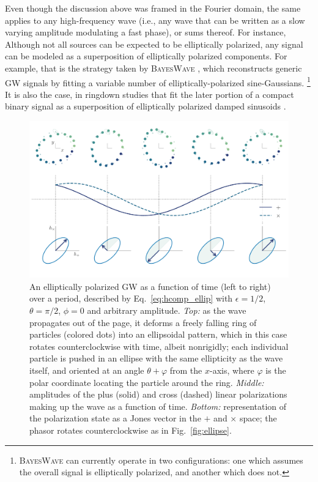 \documentclass[aps,prd,twocolumn,superscriptaddress,preprintnumbers,floatfix,nofootinbib]{revtex4-2}
\begin{document}
Even though the discussion above was framed in the Fourier domain, the same applies to any high-frequency wave (i.e., any wave that can be written as a slow varying amplitude modulating a fast phase), or sums thereof.
For instance, 
Although not all sources can be expected to be elliptically polarized, any signal can be modeled as a superposition of elliptically polarized components.
For example, that is the strategy taken by \textsc{BayesWave} \cite{Cornish:2014kda,Cornish:2020dwh}, which reconstructs generic GW signals by fitting a variable number of elliptically-polarized sine-Gaussians.%
\footnote{\textsc{BayesWave} can currently operate in two configurations: one which assumes the overall signal is elliptically polarized, and another which does not.}
It is also the case, in ringdown studies that fit the later portion of a compact binary signal as a superposition of elliptically polarized damped sinusoids \cite{Isi:2021iql}.

\begin{figure}
\includegraphics[width=\columnwidth]{pol_diagram_ellip}
\caption{An elliptically polarized GW as a function of time (left to right) over a period, described by Eq.~\eqref{eq:hcomp_ellip} with $\epsilon=1/2$, $\theta=\pi/2$, $\phi=0$ and arbitrary amplitude. \emph{Top:} as the wave propagates out of the page, it deforms a freely falling ring of particles (colored dots) into an ellipsoidal pattern, which in this case rotates counterclockwise with time, albeit nonrigidly; each individual particle is pushed in an ellipse with the same ellipticity as the wave itself, and oriented at an angle $\theta + \varphi$ from the $x$-axis, where $\varphi$ is the polar coordinate locating the particle around the ring.
\emph{Middle:} amplitudes of the plus (solid) and cross (dashed) linear polarizations making up the wave as a function of time.
\emph{Bottom:} representation of the polarization state as a Jones vector in the $+$ and $\times$ space; the phasor rotates counterclockwise as in Fig.~\ref{fig:ellipse}.
}
\label{fig:pol_diagram_ellip}
\end{figure}
\end{document}
